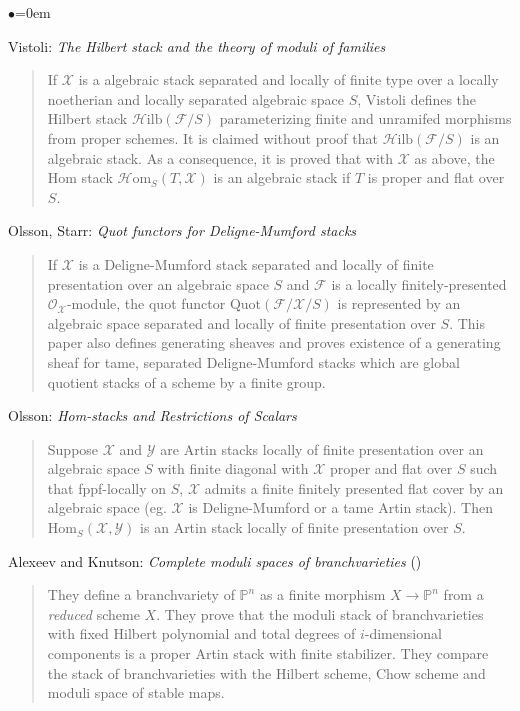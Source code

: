 \begin{list}{$\bullet$}{\leftmargin=0em}
\item Vistoli: \emph{The Hilbert stack and the theory of moduli of families}
\cite{vistoli_hilbert}
\begin{quote}
If $\mathcal{X}$ is a algebraic stack separated and locally of finite type
over a locally noetherian and locally separated algebraic space $S$, Vistoli
defines the Hilbert stack $\mathcal{H}\text{ilb}(\mathcal{F} / S)$
parameterizing finite and unramifed morphisms from proper schemes.
It is claimed without proof that $\mathcal{H}\text{ilb}(\mathcal{F} / S)$
is an algebraic stack.  As a consequence, it is proved that with $\mathcal{X}$
as above, the Hom stack $\mathcal{H} \text{om}_S(T, \mathcal{X})$ is an
algebraic stack if $T$ is proper and flat over $S$.     
\end{quote}
\smallskip
\item Olsson, Starr: \emph{Quot functors for Deligne-Mumford stacks}
\cite{olsson-starr}
\begin{quote}
If $\mathcal{X}$ is a Deligne-Mumford stack separated and locally of finite
presentation over an algebraic space $S$ and $\mathcal{F}$ is a locally
finitely-presented $\mathcal{O}_{\mathcal{X}}$-module, the quot functor
$\text{Quot}(\mathcal{F} / \mathcal{X} / S)$ is represented by an algebraic
space separated and locally of finite presentation over $S$.  This paper
also defines generating sheaves and proves existence of a generating sheaf
for tame, separated Deligne-Mumford stacks which are global quotient stacks
of a scheme by a finite group.  
\end{quote}
\smallskip

\item Olsson: \emph{Hom-stacks and Restrictions of Scalars}
\cite{olsson_homstacks}
\begin{quote}
Suppose $\mathcal{X}$ and $\mathcal{Y}$ are Artin stacks locally of finite
presentation over an algebraic space $S$ with finite diagonal with
$\mathcal{X}$ proper and flat over $S$ such that fppf-locally on $S$,
$\mathcal{X}$ admits a finite finitely presented flat cover by an algebraic
space (eg. $\mathcal{X}$ is Deligne-Mumford or a tame Artin stack).
Then $\text{Hom}_S(\mathcal{X}, \mathcal{Y})$ is an Artin stack locally
of finite presentation over $S$.
\end{quote}
\smallskip

\item Alexeev and Knutson:  \emph{Complete moduli spaces of branchvarieties}
(\cite{alexeev-knutson})
\begin{quote}
They define a branchvariety of $\mathbb{P}^n$ as a finite morphism
$X \rightarrow \mathbb{P}^n$ from a \emph{reduced} scheme $X$.  They prove
that the moduli stack of branchvarieties with fixed Hilbert polynomial and
total degrees of $i$-dimensional components is a proper Artin stack with
finite stabilizer.  They compare the stack of branchvarieties with the
Hilbert scheme, Chow scheme and moduli space of stable maps.
\end{quote}
\smallskip


\end{list}
